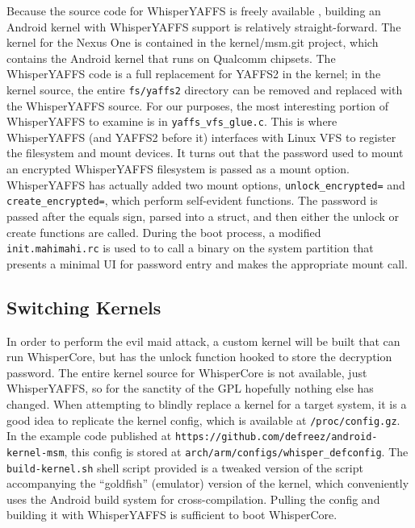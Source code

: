 Because the source code for WhisperYAFFS is freely available \cite{whisperyaffs}, building an Android kernel with WhisperYAFFS
support is relatively straight-forward. The kernel for the Nexus One is contained in the kernel/msm.git project, which contains the
Android kernel that runs on Qualcomm chipsets.  The WhisperYAFFS code is a full replacement for YAFFS2 in the kernel; in the kernel
source, the entire \texttt{fs/yaffs2} directory can be removed and replaced with the WhisperYAFFS source.  For our purposes, the most
interesting portion of WhisperYAFFS to examine is in \texttt{yaffs\_vfs\_glue.c}.  This is where WhisperYAFFS (and YAFFS2 before it)
interfaces with Linux VFS to register the filesystem and mount devices.  It turns out that the password used to mount an encrypted
WhisperYAFFS filesystem is passed as a mount option.  WhisperYAFFS has actually added two mount options, \texttt{unlock\_encrypted=}
and \texttt{create\_encrypted=}, which perform self-evident functions.  The password is passed after the equals sign, parsed into a
struct, and then either the unlock or create functions are called.  During the boot process, a modified \texttt{init.mahimahi.rc} is
used to to call a binary on the system partition that presents a minimal UI for password entry and makes the appropriate mount call. 

\subsection{Switching Kernels}
In order to perform the evil maid attack, a custom kernel will be built that can run WhisperCore, but has the unlock function hooked
to store the decryption password.  The entire kernel source for WhisperCore is not available, just WhisperYAFFS, so for the sanctity
of the GPL hopefully nothing else has changed.  When attempting to blindly replace a kernel for a target system, it is a good idea
to replicate the kernel config, which is available at \texttt{/proc/config.gz}.  In the example code published at
\texttt{https://github.com/defreez/android-kernel-msm}, this config is stored at \texttt{arch/arm/configs/whisper\_defconfig}.  The
\texttt{build-kernel.sh} shell script provided is a tweaked version of the script accompanying the ``goldfish'' (emulator) version
of the kernel, which conveniently uses the Android build system for cross-compilation.  Pulling the config and building it with
WhisperYAFFS is sufficient to boot WhisperCore.

